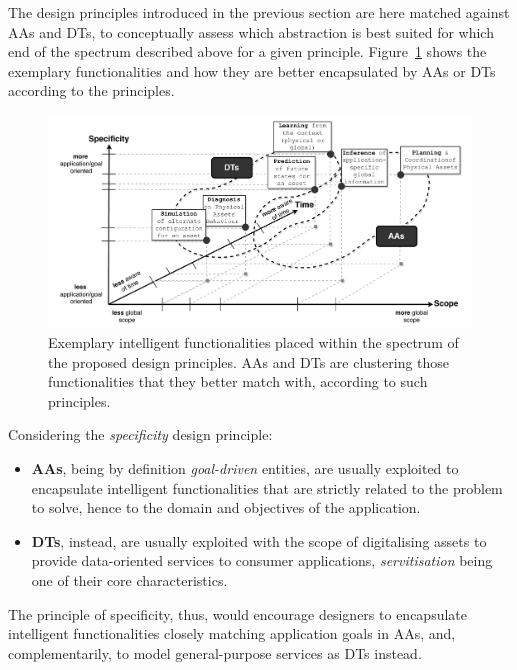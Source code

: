 The design principles introduced in the previous section are here matched against AAs and DTs, to conceptually assess which abstraction is best suited for which end of the spectrum described above for a given principle. 
Figure~\ref{fig:principles} shows the exemplary functionalities and how they are better encapsulated by AAs or DTs according to the principles. 

\begin{figure}
    \centering
    \includegraphics[width=\columnwidth]{figures/dt-mas/principles-aa-dt.pdf}
    \caption{Exemplary intelligent functionalities placed within the spectrum of the proposed design principles. AAs and DTs are clustering those functionalities that they better match with, according to such principles.}
    \label{fig:principles}
\end{figure}

Considering the \emph{specificity} design principle:
\begin{itemize}
\item \textbf{AAs}, being by definition \emph{goal-driven} entities, are usually exploited to encapsulate intelligent functionalities that are strictly related to the problem to solve, hence to the domain and objectives of the application. 
\item \textbf{DTs}, instead, are usually exploited with the scope of digitalising assets to provide data-oriented services to consumer applications, \emph{servitisation} being one of their core characteristics. 
\end{itemize}
The principle of specificity, thus, would encourage designers to encapsulate intelligent functionalities closely matching application goals in AAs, and, complementarily, to model general-purpose services as DTs instead. 


